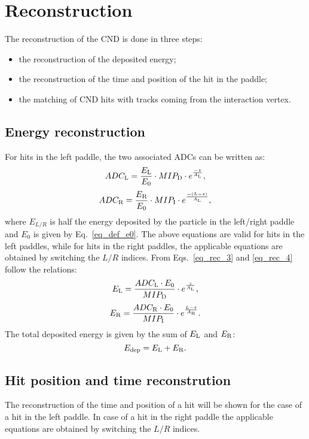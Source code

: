 \section{Reconstruction}\label{sec_rec}
The reconstruction of the CND is done in three steps:
\begin{itemize}
\item{the reconstruction of the deposited energy;}
\item{the reconstruction of the time and position of the hit in the paddle;}
\item{the matching of CND hits with tracks coming from the interaction vertex.}
\end{itemize}

\subsection{Energy reconstruction}
For hits in the left paddle, the two associated ADCs can be written as:
\begin{equation}
\label{eq_rec_3}
ADC_{\rm{L}}=\frac{E_{\rm{L}}}{E_0}\cdot MIP_{\rm{D}}\cdot e^{\frac{-z}{A_{\rm{L}}}},
\end{equation}
\begin{equation}
\label{eq_rec_4}
ADC_{\rm{R}}=\frac{E_{\rm{R}}}{E_0}\cdot MIP_{\rm{I}}\cdot e^{\frac{-(L-z)}{A_{\rm{L}}}},
\end{equation}
where $E_{L/R}$ is half the energy deposited by the particle in the left/right paddle and $E_0$ is given by Eq.~\ref{eq_def_e0}.
The above equations are valid for hits in the left paddles, while for hits in the right paddles, the applicable equations are obtained by switching the $L/R$ indices.
From Eqs.~\ref{eq_rec_3} and \ref{eq_rec_4} follow the relations:
\begin{equation}
E_{\rm{L}}=\frac{ADC_{\rm{L}} \cdot E_0}{MIP_{\rm{D}}}\cdot e^{\frac{z}{A_{\rm{L}}}},
\end{equation}
\begin{equation}
E_{\rm{R}}=\frac{ADC_{\rm{R}} \cdot E_0}{MIP_{\rm{I}}}\cdot e^{\frac{L-z}{A_{\rm{R}}}}.
\end{equation}
The total deposited energy is given by the sum of $E_{\rm{L}}$ and $E_{\rm{R}}$:
\begin{equation}
E_{\rm{dep}}=E_{\rm{L}}+E_{\rm{R}}.
\end{equation}

\subsection{Hit position and time reconstrution}
The reconstruction of the time and position of a hit will be shown for the case of a hit in the left paddle. In case of a hit in the right paddle the applicable equations are obtained by switching the $L/R$ indices.

